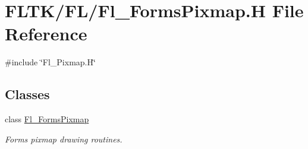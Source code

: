 \hypertarget{_fl___forms_pixmap_8_h}{}\section{F\+L\+T\+K/\+F\+L/\+Fl\+\_\+\+Forms\+Pixmap.H File Reference}
\label{_fl___forms_pixmap_8_h}
{\ttfamily \#include \char`\"{}Fl\+\_\+\+Pixmap.\+H\char`\"{}}\newline
\subsection*{Classes}
\begin{DoxyCompactItemize}
\item 
class \hyperlink{class_fl___forms_pixmap}{Fl\+\_\+\+Forms\+Pixmap}
\begin{DoxyCompactList}\small\item\em Forms pixmap drawing routines. \end{DoxyCompactList}\end{DoxyCompactItemize}
